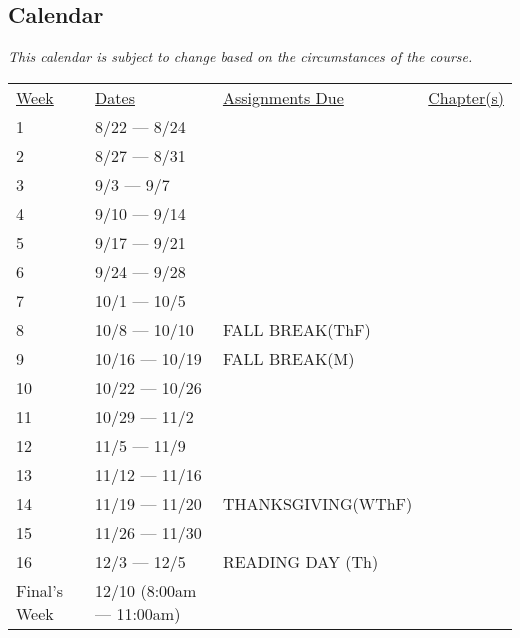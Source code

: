 \documentclass[10pt]{article}
\begin{document}
\subsection{Calendar}

\textit{This calendar is subject to change based on the circumstances of the course.}

\begin{center}
\begin{tabular}{llll}
\underline{Week} & \underline{Dates} & \underline{Assignments Due} & \underline{Chapter(s)}\\
1 & 8/22 --- 8/24 &  &  \\
2 & 8/27 --- 8/31 &  &   \\
3 & 9/3 --- 9/7 &  &   \\
4 & 9/10 --- 9/14 &  &   \\
5 & 9/17 --- 9/21 &  &   \\
6 & 9/24 --- 9/28 &  &   \\
7 & 10/1 --- 10/5 &  &   \\
8 & 10/8 --- 10/10 & FALL BREAK(ThF) &  \\
9 & 10/16 --- 10/19 & FALL BREAK(M) &  \\
10 & 10/22 --- 10/26 &  &   \\
11 & 10/29 --- 11/2 &  &   \\
12 & 11/5 --- 11/9 &  &   \\
13 & 11/12 --- 11/16 &  &   \\
14 & 11/19 --- 11/20 & THANKSGIVING(WThF) & \\
15 & 11/26 --- 11/30 &   &  \\
16 & 12/3 --- 12/5 &  READING DAY (Th) & \\
Final's Week & 12/10 (8:00am --- 11:00am) & \\
\end{tabular}
\end{center}
\end{document}
